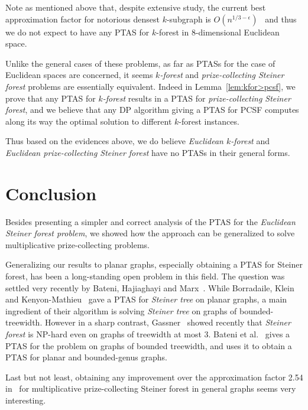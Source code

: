 \documentclass[extras,11pt]{article} \usepackage{fullpage}
\theoremstyle{mytheorem}
\newcommand{\prob}[1]{\textit{#1}}
\begin{document}
Note as mentioned above that, despite extensive study, 
the current best approximation factor 
for notorious densest $k$-subgraph is
$O(n^{1/3-\epsilon})$~\cite{FKP01} and thus we do not expect
to have any PTAS for $k$-forest in $8$-dimensional Euclidean space.



Unlike the general cases of these problems,
 as far as PTASs for the case of Euclidean spaces are concerned,
 it seems \prob{$k$-forest} and \prob{prize-collecting Steiner forest} problems are essentially equivalent.
 Indeed in Lemma~\ref{lem:kfor>pcsf}, we prove that any PTAS for \prob{$k$-forest} results in a PTAS for \prob{prize-collecting Steiner
 forest},
 and we believe that any DP algorithm giving a PTAS for PCSF computes
 along its way the optimal solution to different $k$-forest instances.


Thus based on the evidences above, we do believe \prob{Euclidean
$k$-forest} and \prob{Euclidean prize-collecting Steiner forest}
have no PTASs in their general forms.






\section{Conclusion}
\label{sec:conclusion} Besides presenting a simpler and correct
analysis of the PTAS for the \prob{Euclidean Steiner forest
problem}, we showed how the approach can be generalized to solve
multiplicative prize-collecting problems.



Generalizing our results to planar graphs, especially obtaining a
PTAS for Steiner forest, has been a long-standing open problem in this field.
The question was settled very recently by Bateni, Hajiaghayi and Marx~\cite{BHM09:forest}.
While Borradaile, Klein and Kenyon-Mathieu~\cite{BKM07} gave a
PTAS for \prob{Steiner tree} on planar graphs, a main ingredient
of their algorithm is solving \prob{Steiner tree} on graphs of
bounded-treewidth. However in a sharp contrast, Gassner~\cite{Gas08}
showed recently that \prob{Steiner forest} is NP-hard even on graphs of
treewidth at most 3.
Bateni et al.~\cite{BHM09:forest} 
gives a PTAS for the problem on graphs of bounded treewidth,
and uses it to obtain a PTAS for planar and bounded-genus graphs.


Last but not least, obtaining any improvement over the approximation
factor 2.54 in~\cite{HJ06} for multiplicative prize-collecting
Steiner forest in general graphs seems very interesting.
\end{document}
